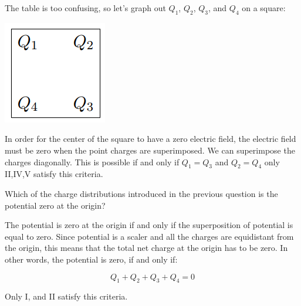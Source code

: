 \clearpage
\begin{solution}
The table is too confusing, so let's graph out $Q_1$, $Q_2$, $Q_3$, and $Q_4$ on a square:

\begin{center}
\includegraphics{Figures/Figure29}
\end{center}

In order for the center of the square to have a zero electric field, the electric field must be zero when the point charges are superimposed. We can superimpose the charges diagonally. This is possible if and only if $Q_1 = Q_3$ and $Q_2 = Q_4$ only II,IV,V satisfy this criteria.

\end{solution}


\begin{question}
Which of the charge distributions introduced in the previous question is the potential zero at the origin?
\end{question}

\begin{solution}
The potential is zero at the origin if and only if the superposition of potential is equal to zero. Since potential is a scaler and all the charges are equidistant from the origin, this means that the total net charge at the origin has to be zero. In other words, the potential is zero, if and only if:

\begin{equation*}
    Q_1+Q_2+Q_3+Q_4=0
\end{equation*}

Only I, and II satisfy this criteria.

\end{solution}

